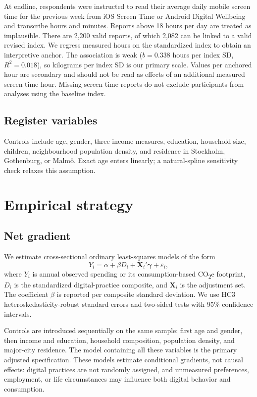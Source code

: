 \documentclass[11pt,a4paper]{article}
\begin{document}
At endline, respondents were instructed to read their average daily mobile
screen time for the previous week from iOS Screen Time or Android Digital
Wellbeing and transcribe hours and minutes. Reports above 18 hours per day are
treated as implausible. There are 2,200 valid reports, of which 2,082 can be
linked to a valid revised index. We regress measured hours on the standardized
index to obtain an interpretive anchor. The association is weak
($b=0.338$ hours per index SD, $R^2=0.018$), so kilograms per index SD is our
primary scale. Values per anchored hour are secondary and should not be read as
effects of an additional measured screen-time hour. Missing screen-time reports
do not exclude participants from analyses using the baseline index.

\subsection{Register variables}
Controls include age, gender, three income measures, education, household size,
children, neighbourhood population density, and residence in Stockholm,
Gothenburg, or Malm\"o. Exact age enters linearly; a natural-spline sensitivity
check relaxes this assumption.

\section{Empirical strategy}

\subsection{Net gradient}
We estimate cross-sectional ordinary least-squares models of the form
\begin{equation}
	Y_i = \alpha + \beta D_i + \boldsymbol{X}_i'\boldsymbol{\gamma} + \varepsilon_i,
	\label{eq:main}
\end{equation}
where $Y_i$ is annual observed spending or its consumption-based
CO\textsubscript{2}e footprint, $D_i$ is the standardized digital-practice
composite, and $\boldsymbol{X}_i$ is the adjustment set. The coefficient
$\beta$ is reported per composite standard deviation. We use HC3
heteroskedasticity-robust standard errors and two-sided tests with 95\%
confidence intervals.

Controls are introduced sequentially on the same sample: first age and gender,
then income and education, household composition, population density, and
major-city residence. The model containing all these variables is the primary
adjusted specification.
These models estimate conditional gradients, not causal effects: digital
practices are not randomly assigned, and unmeasured preferences, employment,
or life circumstances may influence both digital behavior and consumption.
\end{document}
